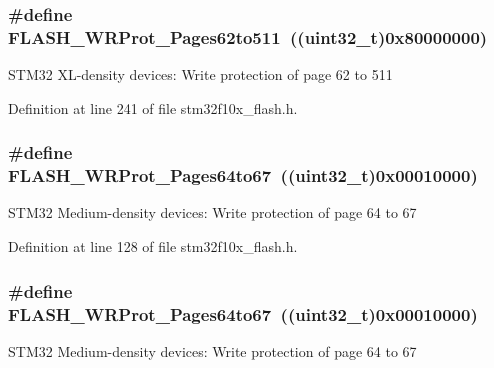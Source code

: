\subsubsection[{\texorpdfstring{F\+L\+A\+S\+H\+\_\+\+W\+R\+Prot\+\_\+\+Pages62to511}{FLASH_WRProt_Pages62to511}}]{\setlength{\rightskip}{0pt plus 5cm}\#define F\+L\+A\+S\+H\+\_\+\+W\+R\+Prot\+\_\+\+Pages62to511~(({\bf uint32\+\_\+t})0x80000000)}\hypertarget{group___option___bytes___write___protection_gab233da6081eaf5d664f16c0e8c7df138}{}\label{group___option___bytes___write___protection_gab233da6081eaf5d664f16c0e8c7df138}
S\+T\+M32 X\+L-\/density devices\+: Write protection of page 62 to 511 

Definition at line 241 of file stm32f10x\+\_\+flash.\+h.

\subsubsection[{\texorpdfstring{F\+L\+A\+S\+H\+\_\+\+W\+R\+Prot\+\_\+\+Pages64to67}{FLASH_WRProt_Pages64to67}}]{\setlength{\rightskip}{0pt plus 5cm}\#define F\+L\+A\+S\+H\+\_\+\+W\+R\+Prot\+\_\+\+Pages64to67~(({\bf uint32\+\_\+t})0x00010000)}\hypertarget{group___option___bytes___write___protection_ga124928d6134ddac13e3e8810a0d8dd1a}{}\label{group___option___bytes___write___protection_ga124928d6134ddac13e3e8810a0d8dd1a}
S\+T\+M32 Medium-\/density devices\+: Write protection of page 64 to 67 

Definition at line 128 of file stm32f10x\+\_\+flash.\+h.

\subsubsection[{\texorpdfstring{F\+L\+A\+S\+H\+\_\+\+W\+R\+Prot\+\_\+\+Pages64to67}{FLASH_WRProt_Pages64to67}}]{\setlength{\rightskip}{0pt plus 5cm}\#define F\+L\+A\+S\+H\+\_\+\+W\+R\+Prot\+\_\+\+Pages64to67~(({\bf uint32\+\_\+t})0x00010000)}\hypertarget{group___option___bytes___write___protection_ga124928d6134ddac13e3e8810a0d8dd1a}{}\label{group___option___bytes___write___protection_ga124928d6134ddac13e3e8810a0d8dd1a}
S\+T\+M32 Medium-\/density devices\+: Write protection of page 64 to 67 

